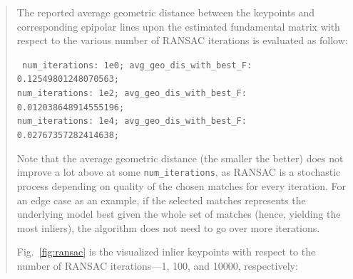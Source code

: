 \documentclass[11pt]{article}
\begin{document}
\begin{quote}
The reported average geometric distance between the keypoints and corresponding epipolar lines upon the estimated fundamental matrix with respect to the various number of RANSAC iterations is evaluated as follow:

{\tt
num\_iterations: 1e0; avg\_geo\_dis\_with\_best\_F: 0.12549801248070563; \\
num\_iterations: 1e2; avg\_geo\_dis\_with\_best\_F: 0.012038648914555196; \\
num\_iterations: 1e4; avg\_geo\_dis\_with\_best\_F: 0.02767357282414638;
}

Note that the average geometric distance (the smaller the better) does not improve a lot above at some \texttt{num\_iterations}, as RANSAC is a stochastic process depending on quality of the chosen matches for every iteration. For an edge case as an example, if the selected matches represents the underlying model best given the whole set of matches (hence, yielding the most inliers), the algorithm does not need to go over more iterations. 

Fig.~\ref{fig:ransac} is the visualized inlier keypoints with respect to the number of RANSAC iterations---1, 100, and 10000, respectively:


\end{quote}
\end{document}
